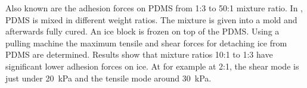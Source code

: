 Also known are the adhesion forces on PDMS from 1:3 to 50:1 mixture ratio. In \cite{IbanezIbanez.2022}, PDMS is mixed in different weight ratios. The mixture is given into a mold and afterwards fully cured. An ice block is frozen on top of the PDMS. Using a pulling machine the maximum tensile and shear forces for detaching ice from PDMS are determined. Results show that mixture ratios 10:1 to 1:3 have significant lower adhesion forces on ice. At for example at 2:1, the shear mode is just under \SI{20}{\kilo\pascal} and the tensile mode around \SI{30}{\kilo\pascal}. 



